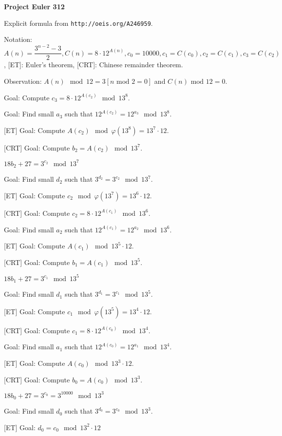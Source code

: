 \documentclass[a4paper,12pt]{article}
\begin{document}
\setlength\parindent{0pt}
\textbf{Project Euler 312}
\vspace{5ex}

Explicit formula from \texttt{http://oeis.org/A246959}.

Notation: \(A(n) = \dfrac{3^{n - 2} - 3}{2}, C(n) = 8 \cdot 12^{A(n)}, c_0 = 10000, c_1 = C(c_0), c_2 = C(c_1), c_3 = C(c_2)\), [ET]: Euler's theorem, [CRT]: Chinese remainder theorem.

Observation: \(A(n) \mod 12 = 3[n \text{ mod } 2 = 0]\) and \(C(n) \text{ mod } 12 = 0\).

\vspace{3ex}

Goal: Compute \(c_3 = 8 \cdot 12^{A(c_2)} \mod 13^8\).

Goal: Find small \(a_3\) such that \(12^{A(c_2)} = 12^{a_3} \mod 13^8\).

[ET] Goal: Compute \(A(c_2) \mod \varphi(13^8) = 13^7 \cdot 12\).

[CRT] Goal: Compute \(b_2 = A(c_2) \mod 13^7\).

\(18b_2 + 27 = 3^{c_2} \mod 13^7\)

Goal: Find small \(d_2\) such that \(3^{d_2} = 3^{c_2} \mod 13^7\).

[ET] Goal: Compute \(c_2 \mod \varphi(13^7) = 13^6 \cdot 12\).

[CRT] Goal: Compute \(c_2 = 8 \cdot 12^{A(c_1)} \mod 13^6\).

Goal: Find small \(a_2\) such that \(12^{A(c_1)} = 12^{a_2} \mod 13^6\).

[ET] Goal: Compute \(A(c_1) \mod 13^5 \cdot 12\).

[CRT] Goal: Compute \(b_1 = A(c_1) \mod 13^5\).

\(18b_1 + 27 = 3^{c_1} \mod 13^5\)

Goal: Find small \(d_1\) such that \(3^{d_1} = 3^{c_1} \mod 13^5\).

[ET] Goal: Compute \(c_1 \mod \varphi(13^5) = 13^4 \cdot 12\).

[CRT] Goal: Compute \(c_1 = 8 \cdot 12^{A(c_0)} \mod 13^4\).

Goal: Find small \(a_1\) such that \(12^{A(c_0)} = 12^{a_1} \mod 13^4\).

[ET] Goal: Compute \(A(c_0) \mod 13^3 \cdot 12\).

[CRT] Goal: Compute \(b_0 = A(c_0) \mod 13^3\).

\(18b_0 + 27 = 3^{c_0} = 3^{10000} \mod 13^3\)

Goal: Find small \(d_0\) such that \(3^{d_0} = 3^{c_0} \mod 13^3\).

[ET] Goal: \(d_0 = c_0 \mod 13^2 \cdot 12\)
\end{document}
